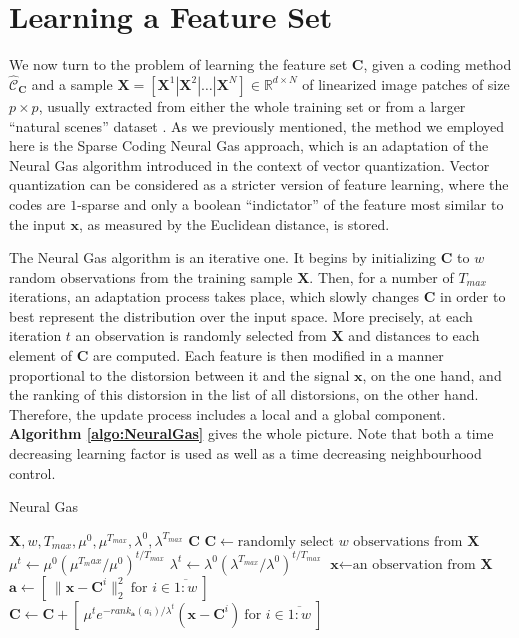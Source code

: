 \documentclass[runningheads,a4paper]{llncs}
\newcommand{\hctimes}[2]{{#1}\!\times\!{#2}}
\newcommand{\hcrange}[2]{\overline{{#1}\colon\!\!{#2}}}
\begin{document}
\section{Learning a Feature Set}

We now turn to the problem of learning the feature set $\textbf{C}$, given a coding method $\hat{\mathcal{C}}_\textbf{C}$ and a sample $\textbf{X} = \left[ \textbf{X}^1 \left|\right. \textbf{X}^2 \left|\right. \dots \left|\right. \textbf{X}^N \right] \in \mathbb{R}^{\hctimes{d}{N}}$ of linearized image patches of size $\hctimes{p}{p}$, usually extracted from either the whole training set or from a larger ``natural scenes'' dataset \cite{self-taught-learning}. As we previously mentioned, the method we employed here is the Sparse Coding Neural Gas approach, which is an adaptation of the Neural Gas algorithm introduced in the context of vector quantization. Vector quantization can be considered as a stricter version of feature learning, where the codes are $1$-sparse and only a boolean ``indictator'' of the feature most similar to the input $\textbf{x}$, as measured by the Euclidean distance, is stored.

The Neural Gas algorithm is an iterative one. It begins by initializing $\textbf{C}$ to $w$ random observations from the training sample $\textbf{X}$. Then, for a number of $T_{max}$ iterations, an adaptation process takes place, which slowly changes $\textbf{C}$ in order to best represent the distribution over the input space. More precisely, at each iteration $t$ an observation is randomly selected from $\textbf{X}$ and distances to each element of $\textbf{C}$ are computed. Each feature is then modified in a manner proportional to the distorsion between it and the signal $\textbf{x}$, on the one hand, and the ranking of this distorsion in the list of all distorsions, on the other hand. Therefore, the update process includes a local and a global component. \textbf{Algorithm \ref{algo:NeuralGas}} gives the whole picture. Note that both a time decreasing learning factor is used as well as a time decreasing neighbourhood control. 

\begin{algorithm}
\caption{Neural Gas}
\label{algo:NeuralGas}
\begin{algorithmic}
\Require $\textbf{X},w,T_{max},\mu^0,\mu^{T_{max}},\lambda^0,\lambda^{T_{max}}$
\Ensure $\textbf{C}$
\State $\textbf{C} \gets \mbox{randomly select $w$ observations from $\textbf{X}$}$
\For {$t = \hcrange{1}{T_{max}}$}
\State $\mu^t \gets \mu^0 (\mu^{T_max} / \mu^0)^{t / T_{max}}$ 
\State $\lambda^t \gets \lambda^0 (\lambda^{T_{max}} / \lambda^0)^{t / T_{max}}$ 
\State $\textbf{x} \gets \text{an observation from $\textbf{X}$}$
\State $\textbf{a} \gets [ ~ \|\textbf{x} - \textbf{C}^i\|_2^2 ~ \mbox{for $i \in \hcrange{1}{w}$} ~ ]$
\State $\textbf{C} \gets \textbf{C} + [ ~ \mu^t e^{-rank_{\textbf{a}}(a_i) / \lambda^t} (\textbf{x} - \textbf{C}^i) ~ \mbox{for $i \in \hcrange{1}{w}$} ~ ]$
\EndFor
\end{algorithmic}
\end{algorithm}
\end{document}

